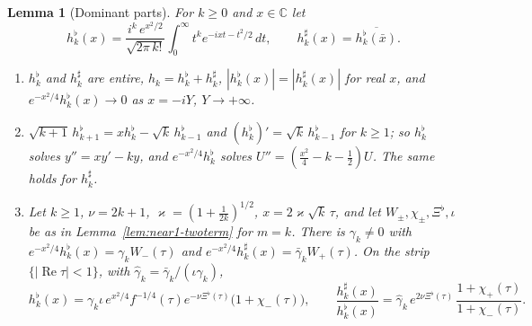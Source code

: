\documentclass[11pt]{amsart}
\newtheorem{lemma}[theorem]{Lemma}
\theoremstyle{definition}
\theoremstyle{remark}
\numberwithin{equation}{section}
\newcommand{\C}{\mathbb{C}}
\DeclareMathOperator{\re}{Re}
\begin{document}
\begin{lemma}[Dominant parts]\label{lem:near1-dominant}
For $k\ge0$ and $x\in\C$ let
\[
h_k^\flat(x)=\frac{i^k\,e^{x^2/2}}{\sqrt{2\pi\,k!}}\int_0^\infty t^ke^{-ixt-t^2/2}\,dt,\qquad h_k^\sharp(x)=\overline{h_k^\flat(\bar x)}.
\]
\begin{enumerate}
\item[(a)] $h_k^\flat$ and $h_k^\sharp$ are entire, $h_k=h_k^\flat+h_k^\sharp$, $|h_k^\flat(x)|=|h_k^\sharp(x)|$ for real $x$, and $e^{-x^2/4}h_k^\flat(x)\to0$ as $x=-iY$, $Y\to+\infty$.
\item[(b)] $\sqrt{k+1}\,h_{k+1}^\flat=xh_k^\flat-\sqrt k\,h_{k-1}^\flat$ and $(h_k^\flat)'=\sqrt k\,h_{k-1}^\flat$ for $k\ge1$; so $h_k^\flat$ solves $y''=xy'-ky$, and $e^{-x^2/4}h_k^\flat$ solves $U''=(\frac{x^2}4-k-\frac12)U$. The same holds for $h_k^\sharp$.
\item[(c)] Let $k\ge1$, $\nu=2k+1$, $\varkappa=(1+\frac1{2k})^{1/2}$, $x=2\varkappa\sqrt k\,\tau$, and let $W_\pm,\chi_\pm,\Xi^\flat,\iota$ be as in Lemma~\ref{lem:near1-twoterm} for $m=k$. There is $\gamma_k\ne0$ with $e^{-x^2/4}h_k^\flat(x)=\gamma_kW_-(\tau)$ and $e^{-x^2/4}h_k^\sharp(x)=\bar\gamma_kW_+(\tau)$. On the strip $\{|\re\tau|<1\}$, with $\hat\gamma_k=\bar\gamma_k/(\iota\gamma_k)$,
\[
h_k^\flat(x)=\gamma_k\iota\,e^{x^2/4}f^{-1/4}(\tau)e^{-\nu\Xi^\flat(\tau)}\bigl(1+\chi_-(\tau)\bigr),\qquad\frac{h_k^\sharp(x)}{h_k^\flat(x)}=\hat\gamma_k\,e^{2\nu\Xi^\flat(\tau)}\,\frac{1+\chi_+(\tau)}{1+\chi_-(\tau)} .
\]
\end{enumerate}
\end{lemma}
\end{document}
